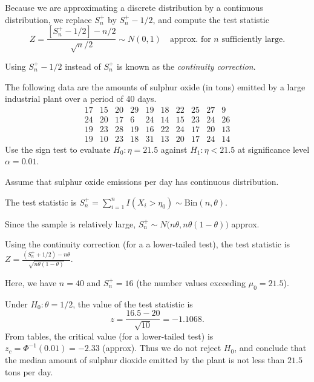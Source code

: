 Because we are approximating a discrete distribution by a continuous distribution, we replace $S^{+}_n$ by $S^{+}_n-1/2$, and compute the test statistic
\[
Z = \frac{[S^{+}_n-1/2] - n/2}{\sqrt{n}/2} \sim N(0,1)\quad\text{approx. for $n$ sufficiently large.}
\]
\begin{remark}
Using $S^{+}_n-1/2$ instead of $S^{+}_n$ is known as the \emph{continuity correction}.
\end{remark}


\begin{example}
The following data are the amounts of sulphur oxide (in tons) emitted by a large industrial plant over a period of 40 days.
\[\begin{array}{cccccccccc}
17 & 15 & 20 & 29 & 19 & 18 & 22 & 25 & 27 &  9 \\
24 & 20 & 17 &  6 & 24 & 14 & 15 & 23 & 24 & 26 \\
19 & 23 & 28 & 19 & 16 & 22 & 24 & 17 & 20 & 13 \\
19 & 10 & 23 & 18 & 31 & 13 & 20 & 17 & 24 & 14
\end{array}\]
Use the sign test to evaluate $H_0:\eta=21.5$ against $H_1:\eta<21.5$ at significance level $\alpha=0.01$.
\end{example}

\begin{solution}
Assume that sulphur oxide emissions per day has continuous distribution.

The test statistic is $S^{+}_n = \sum_{i=1}^n I(X_i > \eta_0) \sim \text{Bin}(n,\theta)$.

Since the sample is relatively large, $S^{+}_n\sim N\big(n\theta,n\theta(1-\theta)\big)$ approx.

Using the continuity correction (for a a lower-tailed test), the test statistic is $Z = \displaystyle\frac{(S^{+}_n+1/2)-n\theta}{\sqrt{n\theta(1-\theta)}}$.

Here, we have $n=40$ and $S^{+}_n=16$ (the number values exceeding $\mu_0 = 21.5$). 

Under $H_0:\theta=1/2$, the value of the test statistic is
\[
z = \frac{16.5 - 20}{\sqrt{10}} = -1.1068.
\]
From tables, the critical value (for a lower-tailed test) is $z_c = \Phi^{-1}(0.01) = -2.33$ (approx). Thus we do not reject $H_0$, and conclude that the median amount of sulphur dioxide emitted by the plant is not less than $21.5$ tons per day.
\end{solution}


